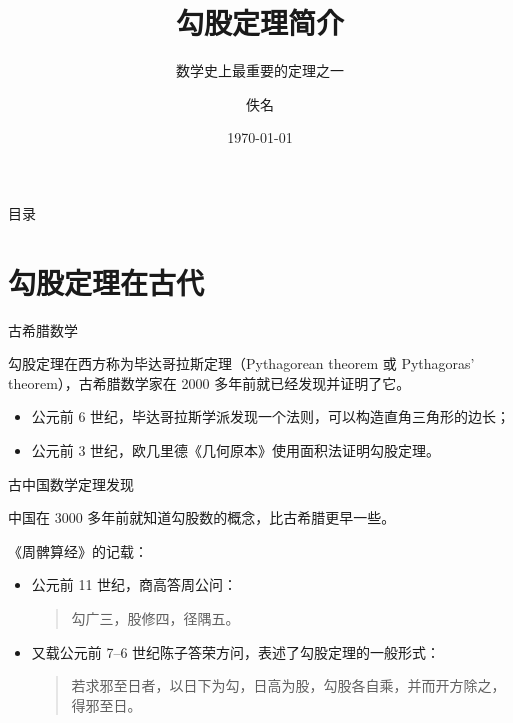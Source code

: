 \documentclass[handout]{ctexbeamer}
\title{勾股定理简介}
\subtitle{数学史上最重要的定理之一}
\author{佚名}
\institute{初中数学协会}
\date{\today}
\begin{document}
\maketitle

\begin{frame}{目录}
\tableofcontents[pausesections]   %
\end{frame}

\section{勾股定理在古代}
\label{sec:ancient}

\begin{frame}{古希腊数学}

勾股定理在西方称为毕达哥拉斯定理（Pythagorean theorem 或 Pythagoras' theorem），古希腊数学家在 2000 多年前就已经发现并证明了它\cite{Kline}。\pause
\begin{itemize}
  \item<+-| alert@+>
    公元前 6 世纪，毕达哥拉斯学派发现一个法则，可以构造直角三角形的边长；
  \item<+-| alert@+>
    公元前 3 世纪，欧几里德《几何原本》使用面积法证明勾股定理。
\end{itemize}
\end{frame}

\begin{frame}{古中国数学}{定理发现}

中国在 3000 多年前就知道勾股数的概念，比古希腊更早一些。\pause

《周髀算经》的记载：\pause
\begin{itemize}[<+-| alert@+>]
  \item 公元前 11 世纪，商高答周公问：
  \begin{quote}
  勾广三，股修四，径隅五。
  \end{quote}
  \item 又载公元前 7--6 世纪陈子答荣方问，表述了勾股定理的一般形式：
  \begin{quote}
  若求邪至日者，以日下为勾，日高为股，勾股各自乘，并而开方除之，得邪至日。
  \end{quote}
\end{itemize}
\end{frame}
\end{document}
